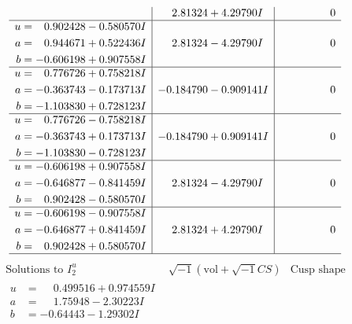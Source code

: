 \documentclass[1p]{elsarticle_modified}
\theoremstyle{definition}
\newcommand{\I}{\sqrt{-1}}
\begin{document}
$$\begin{array}{c|c|c}
 & \phantom{-}2.81324 + 4.29790 I & \phantom{-0.000000 } 0 \\ \hline\begin{aligned}
u &= \phantom{-}0.902428 - 0.580570 I \\
a &= \phantom{-}0.944671 + 0.522436 I \\
b &= -0.606198 + 0.907558 I\end{aligned}
 & \phantom{-}2.81324 - 4.29790 I & \phantom{-0.000000 } 0 \\ \hline\begin{aligned}
u &= \phantom{-}0.776726 + 0.758218 I \\
a &= -0.363743 - 0.173713 I \\
b &= -1.103830 + 0.728123 I\end{aligned}
 & -0.184790 - 0.909141 I & \phantom{-0.000000 } 0 \\ \hline\begin{aligned}
u &= \phantom{-}0.776726 - 0.758218 I \\
a &= -0.363743 + 0.173713 I \\
b &= -1.103830 - 0.728123 I\end{aligned}
 & -0.184790 + 0.909141 I & \phantom{-0.000000 } 0 \\ \hline\begin{aligned}
u &= -0.606198 + 0.907558 I \\
a &= -0.646877 - 0.841459 I \\
b &= \phantom{-}0.902428 - 0.580570 I\end{aligned}
 & \phantom{-}2.81324 - 4.29790 I & \phantom{-0.000000 } 0 \\ \hline\begin{aligned}
u &= -0.606198 - 0.907558 I \\
a &= -0.646877 + 0.841459 I \\
b &= \phantom{-}0.902428 + 0.580570 I\end{aligned}
 & \phantom{-}2.81324 + 4.29790 I & \phantom{-0.000000 } 0\\
 \hline 
 \end{array}$$\newpage$$\begin{array}{c|c|c}  
\text{Solutions to }I^u_{2}& \I (\text{vol} + \sqrt{-1}CS) & \text{Cusp shape}\\
 \hline 
\begin{aligned}
u &= \phantom{-}0.499516 + 0.974559 I \\
a &= \phantom{-}1.75948 - 2.30223 I \\
b &= -0.64443 - 1.29302 I\end{aligned}

\end{array}$$
\end{document}
